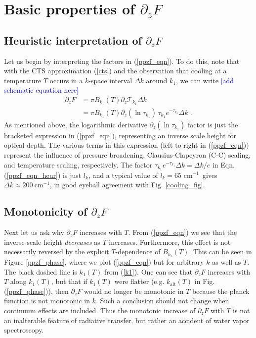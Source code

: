 \documentclass[10pt]{article}
\newcommand{\comment}[1]{\textcolor{blue}{[{#1}]}}
\newcommand{\eqnref}[1]{(\ref{#1})}
\newcommand{\n}{\nonumber}
\newcommand{\ppz}{\ensuremath{\partial_z}}
\newcommand{\FLW}{\ensuremath{F}}
\newcommand{\trans}{\ensuremath{\mathcal{T}}}
\newcommand{\cminverse}{\ensuremath{\mathrm{cm^{-1}}}}
\begin{document}
\section{Basic properties of $\ppz \FLW$}
	\subsection{Heuristic interpretation of $\ppz F$} 
	Let us begin by interpreting the factors in \eqnref{ppzf_eqn}. To do this, note that with the CTS approximation \eqnref{cts} and the observation that cooling at a temperature $T$ occurs in a $k$-space interval $\Delta k$ around $k_1$, we can write \comment{add schematic equation here}
	\begin{align}
		\ppz \FLW & =  \pi B_{k_1}(T) \ppz \trans_{k_1} \Delta k \n \\
				 & =  \pi B_{k_1}(T) \ppz(\ln \tau_{k_1}) \, \tau_{k_1}e^{-\tau_{k_1}} \Delta k \; . 
					\label{ppzf_eqn_heur}
	\end{align}
As mentioned above, the logarithmic derivative $\ppz (\ln \tau_{k_1})$ factor is just the bracketed expression in \eqnref{ppzf_eqn}, representing an  inverse scale height for optical depth. The various terms in this expression (left to right in \eqnref{ppzf_eqn}) represent the influence of pressure broadening,  Clausius-Clapeyron (C-C) scaling, and temperature scaling, respectively. The factor $\tau_{k_1}e^{-\tau_{k_1}} \Delta k = \Delta k/e$ in Eqn. \eqnref{ppzf_eqn_heur} is just $l_k$, and a typical value of $l_k = 65$ \cminverse\ gives $\Delta k \approx 200\ \cminverse$, in good eyeball agreement with Fig. \ref{cooling_fig}.

	\subsection{Monotonicity of $\ppz F$}
Next let us ask why $\ppz F$ increases with $T$. From \eqnref{ppzf_eqn} we see that the inverse scale height  \emph{decreases}  as $T$ increases.  Furthermore, this effect is not necessarily reversed by the explicit $T$-dependence of $B_{k_1}(T)$. This can be seen in Figure \ref{ppzf_phase}, where we plot \eqnref{ppzf_eqn} but for arbitrary $k$ as well as $T$. The black dashed line is  $k_1(T)$ from \eqnref{k1}. One can see that $\ppz F$ increases with $T$ along  $k_1(T)$, but that if $k_1(T)$ were flatter (e.g. $k_{\mathrm{alt}}(T)$ in Fig. \eqnref{ppzf_phase}), then $\ppz F$ would no longer be monotonic in $T$ because the planck function is not monotonic in $k$. Such a conclusion should not change when continuum effects are included. Thus the monotonic increase of $\ppz F$ with $T$ is not an inalterable feature of radiative transfer, but rather an accident of water vapor spectroscopy.
\end{document}
